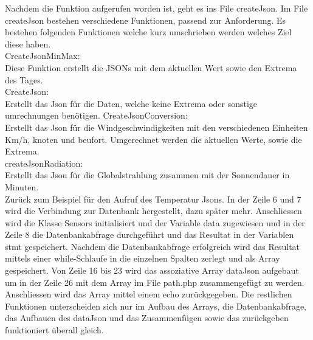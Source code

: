Nachdem die Funktion aufgerufen worden ist, geht es ins File createJson. Im File createJson bestehen verschiedene Funktionen, passend zur Anforderung. Es bestehen folgenden Funktionen welche kurz umschrieben werden welches Ziel diese haben.\\

CreateJsonMinMax:\\
Diese Funktion erstellt die JSONs mit dem aktuellen Wert sowie den Extrema des Tages.\\
CreateJson:\\
Erstellt das Json für die Daten, welche keine Extrema oder sonstige umrechnungen benötigen.
CreateJsonConversion:\\
Erstellt das Json für die Windgeschwindigkeiten mit den verschiedenen Einheiten Km/h, knoten und beufort. Umgerechnet werden die aktuellen Werte, sowie die Extrema.\\
createJsonRadiation:\\
Erstellt das Json für die Globalstrahlung zusammen mit der Sonnendauer in Minuten.\\

Zurück zum Beispiel für den Aufruf des Temperatur Jsons. In der Zeile 6 und 7 wird die Verbindung zur Datenbank hergestellt, dazu später mehr. Anschliessen wird die Klasse Sensors initialisiert und der Variable data zugewiesen und in der Zeile 8 die Datenbankabfrage durchgeführt und das Resultat in der Variablen stmt gespeichert. Nachdem die Datenbankabfrage erfolgreich wird das Resultat mittels einer while-Schlaufe in die einzelnen Spalten zerlegt und als Array gespeichert. Von Zeile 16 bis 23 wird das assoziative Array dataJson aufgebaut um in der Zeile 26 mit dem Array im File path.php zusammengefügt zu werden. Anschliessen wird das Array mittel einem echo zurückgegeben. Die restlichen Funktionen unterscheiden sich nur im Aufbau des Arrays, die Datenbankabfrage, das Aufbauen des dataJson und das Zusammenfügen sowie das zurückgeben funktioniert überall gleich.

